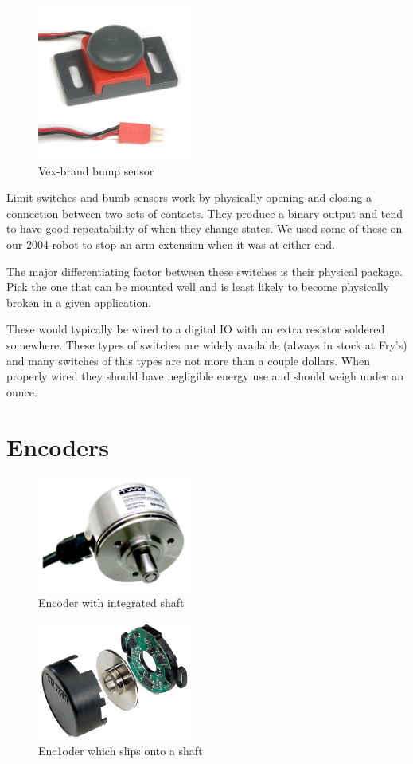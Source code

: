 \documentclass{article}
\begin{document}
\begin{figure}[ht]
\centering
\includegraphics[width=2in]{vex_switch.jpg}
\caption{Vex-brand bump sensor}
\end{figure}

Limit switches and bumb sensors work by physically opening and closing a connection between two sets of contacts.  They produce a binary output and tend to have good repeatability of when they change states.  We used some of these on our 2004 robot to stop an arm extension when it was at either end.  

The major differentiating factor between these switches is their physical package.  Pick the one that can be mounted well and is least likely to become physically broken in a given application.  

These would typically be wired to a digital IO with an extra resistor soldered somewhere.  These types of switches are widely available (always in stock at Fry's) and many switches of this types are not more than a couple dollars.  When properly wired they should have negligible energy use and should weigh under an ounce.  

\section{Encoders}

\begin{figure}[ht]
\centering
\includegraphics[width=2in]{encoder_shaft.jpg}
\caption{Encoder with integrated shaft}
\end{figure}

\begin{figure}[ht]
\centering
\includegraphics[width=2in]{encoder_slip.png}
\caption{Enc1oder which slips onto a shaft}
\end{figure}
\end{document}
